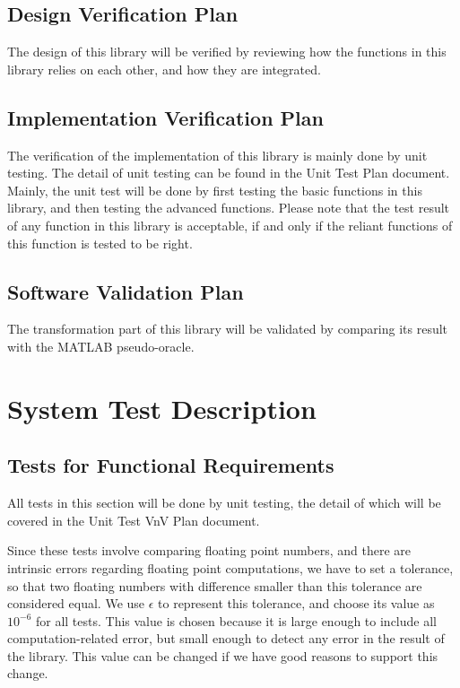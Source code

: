 \documentclass[12pt, titlepage]{article}
\begin{document}
\subsection{Design Verification Plan}

The design of this library will be verified by reviewing how the functions in
this library relies on each other, and how they are integrated.

\subsection{Implementation Verification Plan}

The verification of the implementation of this library is mainly done by unit
testing. The detail of unit testing can be found in the Unit Test Plan
document. Mainly, the unit test will be done by first testing the basic
functions in this library, and then testing the advanced functions. Please note
that the test result of any function in this library is acceptable, if and only
if the reliant functions of this function is tested to be right.
  


\subsection{Software Validation Plan}

The transformation part of this library will be validated by comparing its
result with the MATLAB pseudo-oracle.

\section{System Test Description}
	
\subsection{Tests for Functional Requirements} All tests in this section will be
done by unit testing, the detail of which will be covered in the Unit Test VnV
Plan document.

Since these tests involve comparing floating point numbers, and there are
intrinsic errors regarding floating point computations, we have to set a
tolerance, so that two floating numbers with difference smaller than this
tolerance are considered equal. We use $\epsilon$ to represent this tolerance,
and choose its value as $10^{-6}$ for all tests. This value is chosen because it
is large enough to include all computation-related error, but small enough to
detect any error in the result of the library. This value can be changed if we
have good reasons to support this change.
\end{document}
